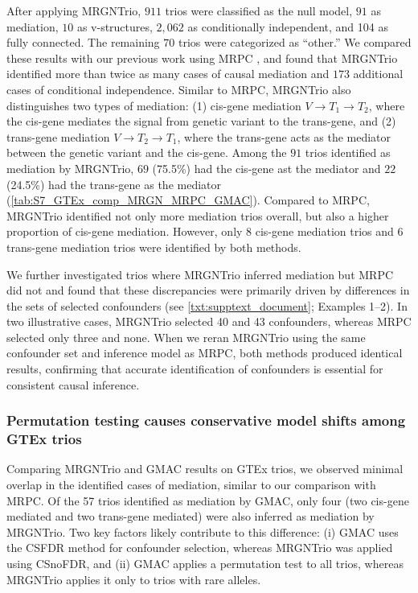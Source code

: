 \documentclass[12pt,letterpaper]{report}
\begin{document}
\begin{doublespace}
After applying MRGNTrio, $911$ trios were classified as the null model, $91$ as mediation, $10$ as v-structures, $2,062$ as conditionally independent, and 104 as fully connected. The remaining $70$ trios were categorized as “other.” We compared these results with our previous work using MRPC \cite{kvamme2022types}, and found that MRGNTrio identified more than twice as many cases of causal mediation and $173$ additional cases of conditional independence. Similar to MRPC, MRGNTrio also distinguishes two types of mediation: (1) cis-gene mediation $V \rightarrow T_1 \rightarrow T_2$, where the cis-gene mediates the signal from genetic variant to the trans-gene, and (2) trans-gene mediation $V \rightarrow T_2 \rightarrow T_1$, where the trans-gene acts as the mediator between the genetic variant and the cis-gene. Among the $91$ trios identified as mediation by MRGNTrio, $69$ (75.5\%) had the cis-gene  ast the mediator and $22$ (24.5\%) had the trans-gene as the mediator (\autoref{tab:S7_GTEx_comp_MRGN_MRPC_GMAC}). Compared to MRPC, MRGNTrio identified not only more mediation trios overall, but also a higher proportion of cis-gene mediation. However, only $8$ cis-gene mediation trios and $6$ trans-gene mediation trios were identified by both methods.

We further investigated trios where MRGNTrio inferred mediation but MRPC did not and found that these discrepancies were primarily driven by differences in the sets of selected confounders (see \autoref{txt:supptext_document}; Examples 1–2). In two illustrative cases, MRGNTrio selected 40 and 43 confounders, whereas MRPC selected only three and none. When we reran MRGNTrio using the same confounder set and inference model as MRPC, both methods produced identical results, confirming that accurate identification of confounders is essential for consistent causal inference.


\subsubsection{Permutation testing causes conservative model shifts among GTEx trios}

Comparing MRGNTrio and GMAC results on GTEx trios, we observed minimal overlap in the identified cases of mediation, similar to our comparison with MRPC. Of the 57 trios identified as mediation by GMAC, only four (two cis-gene mediated and two trans-gene mediated) were also inferred as mediation by MRGNTrio. Two key factors likely contribute to this difference: (i) GMAC uses the CSFDR method for confounder selection, whereas MRGNTrio was applied using CSnoFDR, and (ii) GMAC applies a permutation test to all trios, whereas MRGNTrio applies it only to trios with rare alleles.


\end{doublespace}
\end{document}
